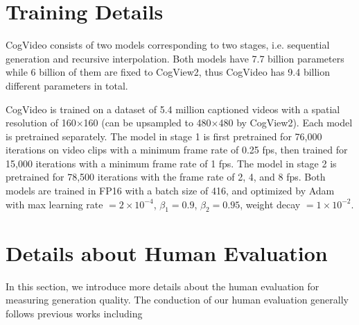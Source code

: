 


\section{Training Details}
CogVideo consists of two models corresponding to two stages, i.e. sequential generation and recursive interpolation. Both models have 7.7 billion parameters while 6 billion of them are fixed to CogView2, thus CogVideo has 9.4 billion different parameters in total. 

CogVideo is trained on a dataset of 5.4 million captioned videos with a spatial resolution of 160$\times$160 (can be upsampled to 480$\times$480 by CogView2). Each model is pretrained separately. The model in stage 1 is first pretrained for 76,000 iterations on video clips with a minimum frame rate of 0.25 fps, then trained for 15,000 iterations with a minimum frame rate of 1 fps. The model in stage 2 is pretrained for 78,500 iterations with the frame rate of 2, 4, and 8 fps. 
Both models are trained in FP16 with a batch size of 416, and optimized by Adam with max learning rate $= 2\times10^{-4}$, $\beta_1 = 0.9$, $\beta_2 = 0.95$, weight decay $=1\times10^{-2}$.



\section{Details about Human Evaluation}
In this section, we introduce more details about the human evaluation for measuring generation quality. The conduction of our human evaluation generally follows previous works including \citet{ramesh2021zero, ding2021cogview}

